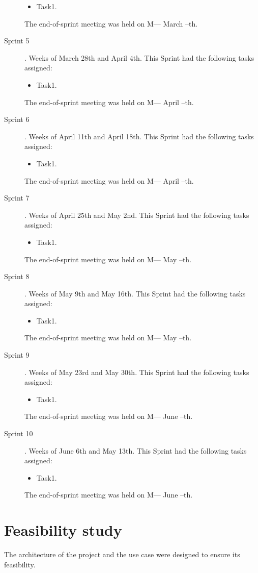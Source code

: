 \begin{description}
\begin{itemize}
		\item Task1.
	\end{itemize}
	The end-of-sprint meeting was held on M--- March --th.
	\item[Sprint 5]. Weeks of March 28th and April 4th. This Sprint had the following tasks assigned:
	\begin{itemize}
		\item Task1.
	\end{itemize}
	The end-of-sprint meeting was held on M--- April --th.
	\item[Sprint 6]. Weeks of April 11th and April 18th. This Sprint had the following tasks assigned:
	\begin{itemize}
		\item Task1.
	\end{itemize}
	The end-of-sprint meeting was held on M--- April --th.
	\item[Sprint 7]. Weeks of April 25th and May 2nd. This Sprint had the following tasks assigned:
	\begin{itemize}
		\item Task1.
	\end{itemize}
	The end-of-sprint meeting was held on M--- May --th.
	\item[Sprint 8]. Weeks of May 9th and May 16th. This Sprint had the following tasks assigned:
	\begin{itemize}
		\item Task1.
	\end{itemize}
	The end-of-sprint meeting was held on M--- May --th.
	\item[Sprint 9]. Weeks of May 23rd and May 30th. This Sprint had the following tasks assigned:
	\begin{itemize}
		\item Task1.
	\end{itemize}
	The end-of-sprint meeting was held on M--- June --th.
	\item[Sprint 10]. Weeks of June 6th and May 13th. This Sprint had the following tasks assigned:
	\begin{itemize}
		\item Task1.
	\end{itemize}
	The end-of-sprint meeting was held on M--- June --th.
\end{description}

\section{Feasibility study}
\nonzeroparskip The architecture of the project and the use case were designed to ensure its feasibility.

